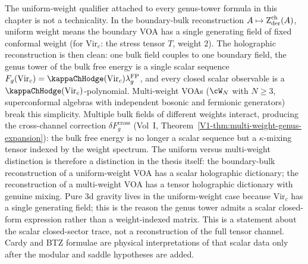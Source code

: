 \begin{remark}
\label{rem:uniform-weight-thesis}
The uniform-weight qualifier attached to every genus-tower
formula in this chapter is not a technicality. In the
boundary-bulk reconstruction
$A \mapsto \operatorname{Z}_{\mathrm{der}}^{\mathrm{ch}}(A)$, uniform weight means the
boundary VOA has a single generating field of fixed
conformal weight (for $\mathrm{Vir}_c$: the stress tensor
$T$, weight $2$). The holographic reconstruction is then
clean: one bulk field couples to one boundary field, the
genus tower of the bulk free energy is a single scalar
sequence
$F_g(\mathrm{Vir}_c)=\kappaChHodge(\mathrm{Vir}_c)
\lambda_g^{\mathrm{FP}}$, and every closed scalar observable is a
\(\kappaChHodge(\mathrm{Vir}_c)\)-polynomial.
Multi-weight VOAs ($\cW_N$ with $N \ge 3$, superconformal
algebras with independent bosonic and fermionic
generators) break this simplicity. Multiple bulk fields of
different weights interact, producing the cross-channel
correction $\delta F_g^{\mathrm{cross}}$
(Vol~I, Theorem~\ref*{V1-thm:multi-weight-genus-expansion}):
the bulk free energy is no longer a scalar sequence but a
$\kappa$-mixing tensor indexed by the weight spectrum.
The uniform versus multi-weight distinction is therefore
a distinction in the thesis itself: the boundary-bulk
reconstruction of a uniform-weight VOA has a scalar
holographic dictionary; the reconstruction of a
multi-weight VOA has a tensor holographic dictionary with
genuine mixing. Pure 3d gravity lives in the
uniform-weight case because $\mathrm{Vir}_c$ has a single
generating field; this is the reason the genus tower admits a scalar
closed-form expression rather than a weight-indexed matrix. This is a
statement about the scalar closed-sector trace, not a reconstruction of
the full tensor channel. Cardy and BTZ formulae are physical
interpretations of that scalar data only after the modular and saddle
hypotheses are added.
\end{remark}


